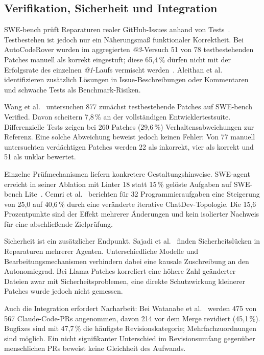 \documentclass[conference]{IEEEtran}
\begin{document}
\subsection{Verifikation, Sicherheit und Integration}
SWE-bench prüft Reparaturen realer GitHub-Issues anhand von Tests~\cite{jimenez2024swebench}. Testbestehen ist jedoch nur ein Näherungsmaß funktionaler Korrektheit. Bei AutoCodeRover wurden im aggregierten \emph{@3}-Versuch 51 von 78 testbestehenden Patches manuell als korrekt eingestuft; diese 65,4\,\% dürfen nicht mit der Erfolgsrate des einzelnen \emph{@1}-Laufs vermischt werden~\cite{zhang2024autocoderover}. Aleithan et al.~\cite{aleithan2024swebenchplus} identifizieren zusätzlich Lösungen in Issue-Beschreibungen oder Kommentaren und schwache Tests als Benchmark-Risiken.

Wang et al.~\cite{wang2026solvedissues} untersuchen 877 zunächst testbestehende Patches auf SWE-bench Verified. Davon scheitern 7,8\,\% an der vollständigen Entwicklertestsuite. Differenzielle Tests zeigen bei 260 Patches (29,6\,\%) Verhaltensabweichungen zur Referenz. Eine solche Abweichung beweist jedoch keinen Fehler: Von 77 manuell untersuchten verdächtigen Patches werden 22 als inkorrekt, vier als korrekt und 51 als unklar bewertet.

Einzelne Prüfmechanismen liefern konkretere Gestaltungshinweise. SWE-agent erreicht in seiner Ablation mit Linter 18 statt 15\,\% gelöste Aufgaben auf SWE-bench Lite~\cite{yang2024sweagent}. Cemri et al.~\cite{cemri2025mast} berichten für 32 Programmieraufgaben eine Steigerung von 25,0 auf 40,6\,\% durch eine veränderte iterative ChatDev-Topologie. Die 15,6 Prozentpunkte sind der Effekt mehrerer Änderungen und kein isolierter Nachweis für eine abschließende Zielprüfung.

Sicherheit ist ein zusätzlicher Endpunkt. Sajadi et al.~\cite{sajadi2025patchsecurity} finden Sicherheitslücken in Reparaturen mehrerer Agenten. Unterschiedliche Modelle und Bearbeitungsmechanismen verhindern dabei eine kausale Zuschreibung an den Autonomiegrad. Bei Llama-Patches korreliert eine höhere Zahl geänderter Dateien zwar mit Sicherheitsproblemen, eine direkte Schutzwirkung kleinerer Patches wurde jedoch nicht gemessen.

Auch die Integration erfordert Nacharbeit: Bei Watanabe et al.~\cite{watanabe2025agenticprs} werden 475 von 567 Claude-Code-PRs angenommen, davon 214 vor dem Merge revidiert (45,1\,\%). Bugfixes sind mit 47,7\,\% die häufigste Revisionskategorie; Mehrfachzuordnungen sind möglich. Ein nicht signifikanter Unterschied im Revisionsumfang gegenüber menschlichen PRs beweist keine Gleichheit des Aufwands.
\end{document}
